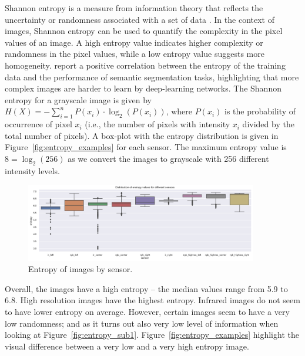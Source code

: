 \documentclass[Master,MDS,english]{BASE/twbook} %
\begin{document}
Shannon entropy is a measure from information theory that reflects the uncertainty or randomness associated with a set of data \citep{6773024}. In the context of images, Shannon entropy can be used to quantify the complexity in the pixel values of an image. A high entropy value indicates higher complexity or randomness in the pixel values, while a low entropy value suggests more homogeneity. \cite{rahane2020measures} report a positive correlation between the entropy of the training data and the performance of semantic segmentation tasks, highlighting that more complex images are harder to learn by deep-learning networks.
The Shannon entropy for a grayscale image is given by $H(X) = -\sum_{i=1}^{n} P(x_i) \cdot \log_2(P(x_i))$, where $P(x_i)$ is the probability of occurrence of pixel $x_i$ (i.e., the number of pixels with intensity $x_i$ divided by the total number of pixels). 
A box-plot with the entropy distribution is given in Figure~\ref{fig:entropy_examples} for each sensor. The maximum entropy value is $8 = \log_2(256)$ as we convert the images to grayscale with 256 different intensity levels.


\begin{figure}[h]
\centering
\includegraphics[width=0.9\textwidth]{images/datasets/db/entropy}
\caption{Entropy of images by sensor. }
\label{fig:entropy}
\end{figure}

Overall, the images have a high entropy -- the median values range from 5.9 to 6.8. High resolution images have the highest entropy. Infrared images do not seem to have lower entropy on average. However, certain images seem to have a very low randomness; and as it turns out also very low level of information when looking at Figure~\ref{fig:entropy_sub1}. Figure~\ref{fig:entropy_examples} highlight the visual difference between a very low and a very high entropy image.
\end{document}
